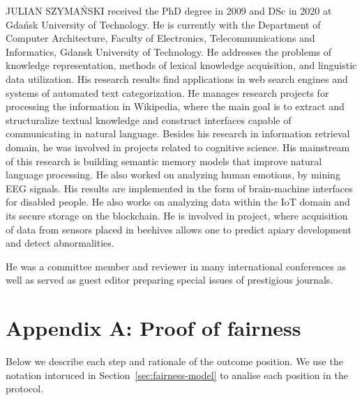 \documentclass{ieeeaccess}
\begin{document}
\begin{IEEEbiography}{JULIAN SZYMA{\'N}SKI}  received the PhD degree in 2009 and DSc in 2020 at Gdańsk University of Technology.
He is currently with the Department of Computer
Architecture, Faculty of Electronics, Telecommunications and Informatics, Gdansk University of Technology. He addresses the problems of knowledge representation, methods of lexical knowledge acquisition, and linguistic data utilization.
His research results find applications in web search engines and systems of automated text categorization. He manages research projects for processing the information in Wikipedia, where the main goal is to extract and structuralize textual knowledge and construct interfaces capable of communicating in natural language. Besides his research in information retrieval domain, he was involved in projects related to cognitive science. His mainstream of this research is building semantic memory models that improve natural language processing. He also worked on analyzing
human emotions, by mining EEG signals. His results are implemented in
the form of brain-machine interfaces for disabled people. He also works
on analyzing data within the IoT domain and its secure storage on the blockchain. 
He is involved in project, where acquisition of data from sensors placed in beehives  allows one to predict apiary development and detect abnormalities. 

He was a committee member and reviewer in  many international
conferences as well as served as guest editor preparing special issues of prestigious journals. 

\end{IEEEbiography}

\appendices

\section{Appendix A: Proof of fairness}\label{app:proof-of-fairness}
Below we describe each step and rationale of the outcome position.
We use the notation intoruced in Section~\ref{sec:fairness-model} to analise each position in the protocol.
\end{document}
